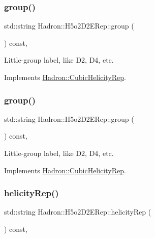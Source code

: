\subsubsection{\texorpdfstring{group()}{group()}\hspace{0.1cm}{\footnotesize\ttfamily [2/3]}}
{\footnotesize\ttfamily std\+::string Hadron\+::\+H5o2\+D2\+E\+Rep\+::group (\begin{DoxyParamCaption}{ }\end{DoxyParamCaption}) const\hspace{0.3cm}{\ttfamily [inline]}, {\ttfamily [virtual]}}

Little-\/group label, like D2, D4, etc. 

Implements \mbox{\hyperlink{structHadron_1_1CubicHelicityRep_a101a7d76cd8ccdad0f272db44b766113}{Hadron\+::\+Cubic\+Helicity\+Rep}}.

\mbox{\label{structHadron_1_1H5o2D2ERep_aba8c064b1c4731c813d921e68d04d021}} 
\subsubsection{\texorpdfstring{group()}{group()}\hspace{0.1cm}{\footnotesize\ttfamily [3/3]}}
{\footnotesize\ttfamily std\+::string Hadron\+::\+H5o2\+D2\+E\+Rep\+::group (\begin{DoxyParamCaption}{ }\end{DoxyParamCaption}) const\hspace{0.3cm}{\ttfamily [inline]}, {\ttfamily [virtual]}}

Little-\/group label, like D2, D4, etc. 

Implements \mbox{\hyperlink{structHadron_1_1CubicHelicityRep_a101a7d76cd8ccdad0f272db44b766113}{Hadron\+::\+Cubic\+Helicity\+Rep}}.

\mbox{\label{structHadron_1_1H5o2D2ERep_a88ae729517bb24fb9254ad77081633af}} 
\subsubsection{\texorpdfstring{helicityRep()}{helicityRep()}\hspace{0.1cm}{\footnotesize\ttfamily [1/2]}}
{\footnotesize\ttfamily std\+::string Hadron\+::\+H5o2\+D2\+E\+Rep\+::helicity\+Rep (\begin{DoxyParamCaption}{ }\end{DoxyParamCaption}) const\hspace{0.3cm}{\ttfamily [inline]}, {\ttfamily [virtual]}}

